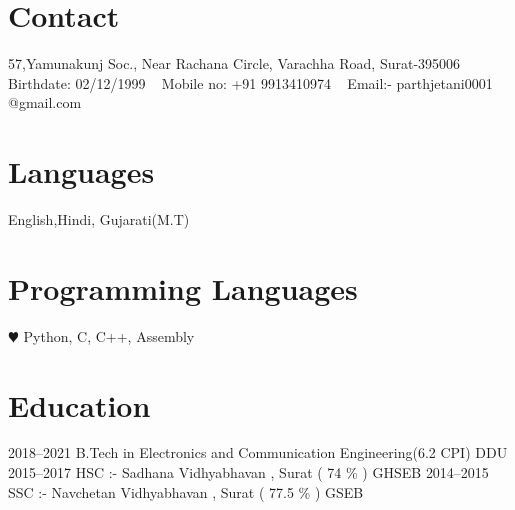 \documentclass[]{cv-style}          %
\begin{document}



\begin{aside}
%
\section{Contact}
57,Yamunakunj Soc.,
Near Rachana Circle,
Varachha Road,
Surat-395006
~
Birthdate:
02/12/1999
~
Mobile no:
+91 9913410974
~
Email:-
parthjetani0001
@gmail.com
~
%
\section{Languages }
{\vspace{0.1cm}}English,Hindi,
Gujarati(M.T)
%
{\vspace{0.5cm}}\section{Programming
   Languages}
{\vspace{0.1cm}}{\color{red} $\varheartsuit$} Python, C, C++,
Assembly
\end{aside}




\vspace{0.3cm}
\section{Education}

\begin{entrylist}
\entry
{2018--2021}
{B.Tech {\normalfont in Electronics and Communication Engineering(6.2 CPI)}}
{DDU}
{\vspace{-0.3cm}}
\entry
{2015--2017}
{HSC :- {\normalfont Sadhana Vidhyabhavan , Surat ( 74 \% ) }}
{GHSEB}
{\vspace{-0.3cm}}
\entry
{2014--2015}
{SSC :- {\normalfont Navchetan Vidhyabhavan , Surat ( 77.5 \% )}}
{GSEB}
{}

\end{entrylist}
\end{document}

